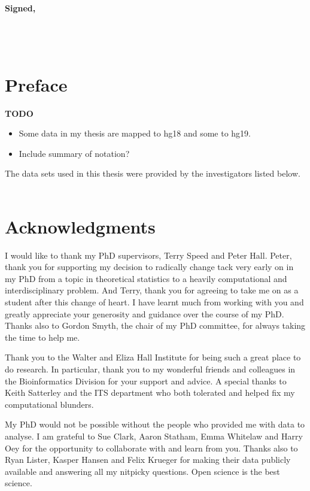 \documentclass[11pt,a4paper,oneside]{book}	%
\begin{document}
\vspace{2cm}


{\large\bf Signed,\\\\\\\\}



\chapter{Preface}

\textbf{TODO}

\begin{itemize}
  \item Some data in my thesis are mapped to hg18 and some to hg19.
  \item Include summary of notation?
\end{itemize}

The data sets used in this thesis were provided by the investigators listed below.\\\\

\chapter{Acknowledgments}

I would like to thank my PhD supervisors, Terry Speed and  Peter Hall. Peter, thank you for supporting my decision to radically change tack very early on in my PhD from a topic in theoretical statistics to a heavily computational and interdisciplinary problem. And Terry, thank you for agreeing to take me on as a student after this change of heart. I have learnt much from working with you and greatly appreciate your generosity and guidance over the course of my PhD. Thanks also to Gordon Smyth, the chair of my PhD committee, for always taking the time to help me.

Thank you to the Walter and Eliza Hall Institute for being such a great place to do research. In particular, thank you to my wonderful friends and colleagues in the Bioinformatics Division for your support and advice. A special thanks to Keith Satterley and the ITS department who both tolerated and helped fix my computational blunders.

My PhD would not be possible without the people who provided me with data to analyse. I am grateful to Sue Clark, Aaron Statham, Emma Whitelaw and Harry Oey for the opportunity to collaborate with and learn from you. Thanks also to Ryan Lister, Kasper Hansen and Felix Krueger for making their data publicly available and answering all my nitpicky questions. Open science is the best science.
\end{document}
